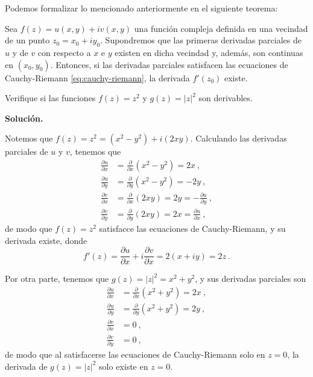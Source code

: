 Podemos formalizar lo mencionado anteriormente en el siguiente teorema:
\begin{teorema}
    Sea $f(z) = u(x,y) + i v(x,y)$ una función compleja definida en una vecindad de un punto $z_0 = x_0 + i y_0$. Supondremos que las primeras derivadas parciales de $u$ y de $v$ con respecto a $x$ e $y$ existen en dicha vecindad y, además, son continuas en $(x_0, y_0)$. Entonces, si las derivadas parciales satisfacen las ecuaciones de Cauchy-Riemann \eqref{eq:cauchy-riemann}, la derivada $f'(z_0)$ existe.
\end{teorema}

\begin{ejemplo}
    Verifique si las funciones $f(z) = z^2$ y $g(z) = |z|^2$ son derivables.

    \noindent \textbf{Solución.}

    Notemos que $f(z) = z^2 = (x^2-y^2) + i(2xy)$. Calculando las derivadas parciales de $u$ y $v$, tenemos que
    \begin{align*}
        \frac{\partial u}{\partial x} & = \frac{\partial}{\partial x}(x^2-y^2) = 2x \ , \\
        \frac{\partial u}{\partial y} & = \frac{\partial}{\partial y}(x^2-y^2) = -2y \ , \\
        \frac{\partial v}{\partial x} & = \frac{\partial}{\partial x}(2xy) = 2y = - \frac{\partial u}{\partial y} \ , \\
        \frac{\partial v}{\partial y} & = \frac{\partial}{\partial y}(2xy) = 2x = \frac{\partial u}{\partial x} \ ,
    \end{align*}
    de modo que $f(z) = z^2$ satisfacce las ecuaciones de Cauchy-Riemann, y su derivada existe, donde 
    \begin{equation*}
        f'(z) = \frac{\partial u}{\partial x} + i \frac{\partial v}{\partial x} = 2(x + iy) = 2z \ .
    \end{equation*}

    Por otra parte, tenemos que $g(z) = |z|^2 = x^2 + y^2$, y sus derivadas parciales son
    \begin{align*}
        \frac{\partial u}{\partial x} & = \frac{\partial}{\partial x}(x^2+y^2) = 2x \ , \\
        \frac{\partial u}{\partial y} & = \frac{\partial}{\partial y}(x^2+y^2) = 2y \ , \\
        \frac{\partial v}{\partial x} & = 0 \ , \\
        \frac{\partial v}{\partial y} & = 0 \ ,
    \end{align*}
    de modo que al satisfacerse las ecuaciones de Cauchy-Riemann solo en $z = 0$, la derivada de $g(z) = |z|^2$ solo existe en $z = 0$.
\end{ejemplo}

